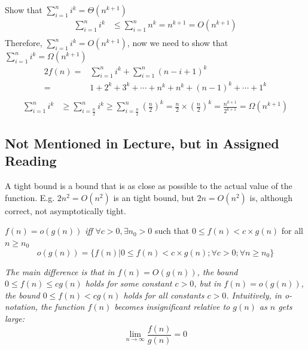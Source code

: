 \begin{example}
    [Summation]
    Show that $\sum_{i=1}^{n} i^k = \Theta(n^{k+1})$
    \begin{align*}
        \sum_{i=1}^{n} i^k & \leq \sum_{i=1}^{n} n^{k} = n^{k+1} = O(n^{k+1}) \\
    \end{align*}
    Therefore, $\sum_{i=1}^{n} i^k = O(n^{k+1})$, now we need to show that $\sum_{i=1}^{n} i^k = \Omega(n^{k+1})$
    \begin{align*}
        2f(n) = & \sum_{i=1}^{n}i^k + \sum_{i=1}^{n}(n-i+1)^k                 \\
        =       & 1 + 2^k + 3^k + \cdots + n^k + n^k + (n-1)^k + \cdots + 1^k \\
    \end{align*}
    \begin{align*}
        \sum_{i=1}^{n} i^k & \geq \sum_{i=\frac{n}{2}}^{n} i^k \geq \sum_{i=\frac{n}{2}}^{n} (\frac{n}{2})^k = \frac{n}{2} \times (\frac{n}{2})^k = \frac{n^{k+1}}{2^{k+1}} = \Omega(n^{k+1})
    \end{align*}
\end{example}

\subsection{Not Mentioned in Lecture, but in Assigned Reading}

\begin{definition}
    A tight bound is a bound that is as close as possible to the actual value of the function. E.g. $2n^2 = O(n^2)$ is an tight bound, but $2n = O(n^2)$ is, although correct, not asymptotically tight.
\end{definition}
\begin{theorem}
    $f(n) = o(g(n))$ \textit{iff} $\forall c > 0, \exists n_0 > 0$ such that $0 \leq f(n) < c\times g(n)$ for all $n \geq n_0$
    \[o(g(n)) = \{f(n) | 0 \leq f(n) < c\times g(n); \forall c > 0; \forall n \geq n_0 \}\]
\end{theorem}

\begin{observation}
    \textit{The main difference is that in $f (n) = O(g(n))$, the bound $0 \leq f (n) \leq cg(n)$ holds for some constant $c > 0$, but in $f (n) = o(g(n))$, the bound $0 \leq f (n) < cg(n)$ holds for all constants $c > 0$. Intuitively, in o-notation, the function $f (n)$ becomes insignificant relative to $g(n)$ as $n$ gets large:
        \[\lim_{n\to \infty} \frac{f(n)}{g(n)}=0\]}

\end{observation}

